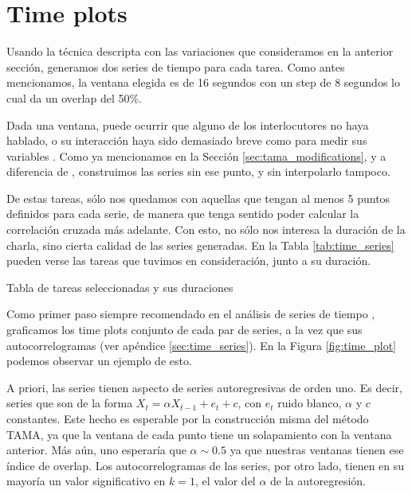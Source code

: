 \section{Time plots}
\label{sec:time_plots}
Usando la técnica descripta con las variaciones que consideramos en la anterior sección, generamos dos series de tiempo para cada tarea. Como antes mencionamos, la ventana elegida es de 16 segundos con un step de 8 segundos lo cual da un overlap del 50\%.

Dada una ventana, puede ocurrir que alguno de los interlocutores no haya hablado, o su interacción haya sido demasiado breve como para medir sus variables \ap. Como ya mencionamos en la Sección \ref{sec:tama_modifications}, y a diferencia de \cite{KOU2008.2}, construimos las series sin ese punto, y sin interpolarlo tampoco.

De estas tareas, sólo nos quedamos con aquellas que tengan al menos 5 puntos definidos para cada serie, de manera que tenga sentido poder calcular la correlación cruzada más adelante. Con esto, no sólo nos interesa la duración de la charla, sino cierta calidad de las series generadas. En la Tabla \ref{tab:time_series} pueden verse las tareas que tuvimos en consideración, junto a su duración.

\begin{table}
\centering

\caption{Tabla de tareas seleccionadas y sus duraciones}
\label{tab:time_series}
\end{table}


Como primer paso siempre recomendado en el análisis de series de tiempo \cite{CHATFIELD}, graficamos los time plots conjunto de cada par de series, a la vez que sus autocorrelogramas (ver apéndice \ref{sec:time_series}). En la Figura \ref{fig:time_plot} podemos observar un ejemplo de esto.

A priori, las series tienen aspecto de series autoregresivas de orden uno. Es decir, series que son de la forma $X_t = \alpha X_{t-1} + e_t + c$, con $e_t$ ruido blanco, $\alpha$ y $c$ constantes. Este hecho es esperable  por la construcción misma del método TAMA, ya que la ventana de cada punto tiene un solapamiento con la ventana anterior. Más aún, uno esperaría que $\alpha \sim 0.5$ ya que nuestras ventanas tienen ese índice de overlap. Los autocorrelogramas de las series, por otro lado, tienen en su mayoría un valor significativo en $k = 1$, el valor del $\alpha$ de la autoregresión.


